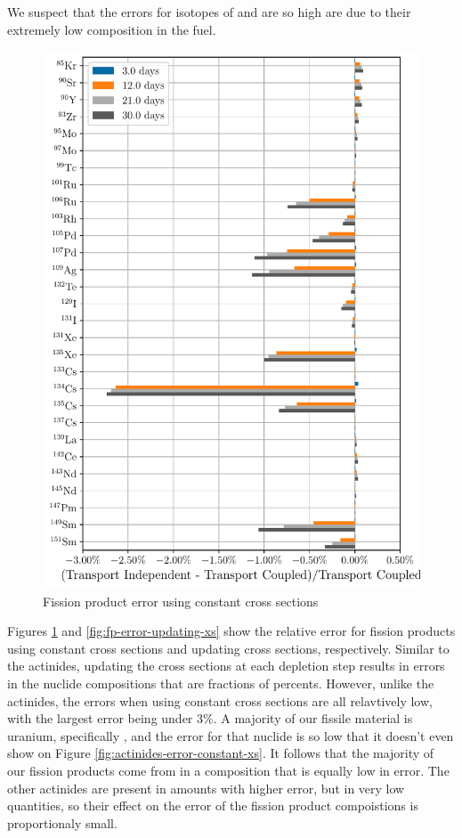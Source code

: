     We suspect that the errors for isotopes of  and  are so high
    are due to their extremely low composition in the fuel.
    \begin{figure}[h!tpb]
        \centering
        \includegraphics[width=\linewidth]{figs/fission_products_constant_xs_predictor_fission_q_days.pdf}
        \caption{Fission product error using constant cross sections}
        \label{fig:fp-error-constant-xs}
    \end{figure}

    Figures \ref{fig:fp-error-constant-xs} and \ref{fig:fp-error-updating-xs}
    show the relative error for fission products using constant cross sections
    and updating cross sections, respectively.
    Similar to the actinides, updating the cross sections at each depletion step
    results in errors in the nuclide compositions  that are fractions of
    percents. However, unlike the actinides, the errors when using constant
    cross sections are all relavtively low, with the largest error being under
    3\%. A majority of our fissile material is uranium, specifically
    , and the error for that nuclide is so low that it doesn't even
    show on Figure \ref{fig:actinides-error-constant-xs}. It follows that the
    majority of our fission products come from  in a composition
    that is equally low in error. The other actinides are present in amounts
    with higher error, but in very low quantities, so their effect on the error
    of the fission product compoistions is proportionaly small.
    
